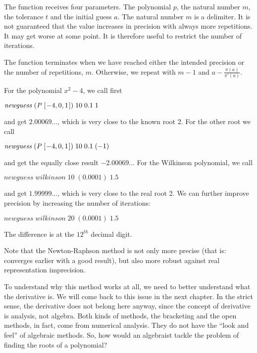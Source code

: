 \documentclass[tikz]{scrreprt}
\newcommand{\Conid}[1]{\mathit{#1}}
\newcommand{\Varid}[1]{\mathit{#1}}
\begin{document}
The function receives four parameters.
The polynomial \ensuremath{\Varid{p}}, the natural number \ensuremath{\Varid{m}},
the tolerance \ensuremath{\Varid{t}} and the initial guess \ensuremath{\Varid{a}}.
The natural number \ensuremath{\Varid{m}} is a delimiter.
It is not guaranteed that the value increases
in precision with always more repetitions.
It may get worse at some point.
It is therefore useful to restrict the number
of iterations.

The function terminates when we have 
reached either the intended precision or 
the number of repetitions, $m$.
Otherwise, we repeat with $m-1$ and
$a - \frac{\pi(a)}{\pi'(a)}$.

For the polynomial $x^2 - 4$, we call first

\ensuremath{\Varid{newguess}\;(\Conid{P}\;[\mskip1.5mu \mathbin{-}\mathrm{4},\mathrm{0},\mathrm{1}\mskip1.5mu])\;\mathrm{10}\;\mathrm{0.1}\;\mathrm{1}}

and get $2.00069\dots$, which is very close
to the known root 2.
For the other root we call

\ensuremath{\Varid{newguess}\;(\Conid{P}\;[\mskip1.5mu \mathbin{-}\mathrm{4},\mathrm{0},\mathrm{1}\mskip1.5mu])\;\mathrm{10}\;\mathrm{0.1}\;(\mathbin{-}\mathrm{1})}

and get the equally close result $-2.00069\dots$
For the Wilkinson polynomial, we call

\ensuremath{\Varid{newguess}\;\Varid{wilkinson}\;\mathrm{10}\;(\mathrm{0.0001})\;\mathrm{1.5}}

and get $1.99999\dots$, which is very close
to the real root 2. We can further improve
precision by increasing the number of iterations:

\ensuremath{\Varid{newguess}\;\Varid{wilkinson}\;\mathrm{20}\;(\mathrm{0.0001})\;\mathrm{1.5}}

The difference is at the $12^{th}$ decimal digit.

Note that the Newton-Raphson method
is not only more precise (that is: converges earlier
with a good result), but also more robust against
real representation imprecision.

To understand why this method works at all,
we need to better understand what the derivative is.
We will come back to this issue in the next chapter.
In the strict sense, the derivative does not belong
here anyway, since the concept of derivative is
analysis, not algebra. Both kinds of methods,
the bracketing and the open methods, in fact, come
from numerical analysis.
They do not have the ``look and feel'' of algebraic
methods. So, how would an algebraist tackle the
problem of finding the roots of a polynomial?
\end{document}
